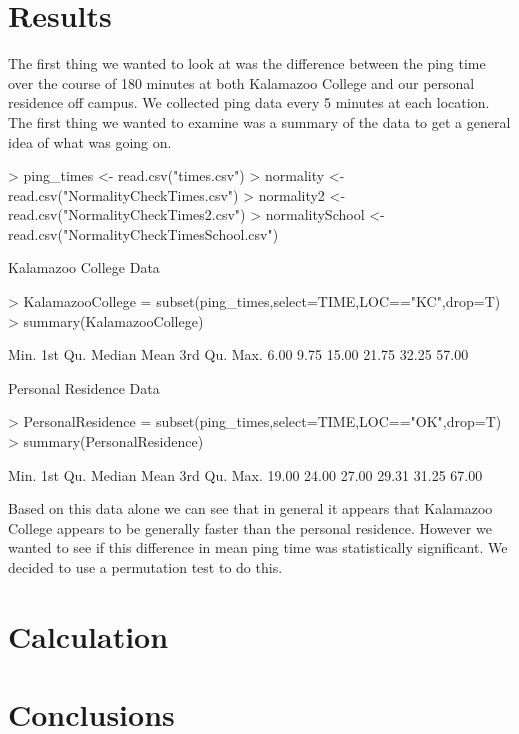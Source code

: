 \documentclass{article}
\begin{document}
\section{Results}
The first thing we wanted to look at was the difference between the ping time over the course of 180 minutes at both Kalamazoo College and our personal residence off campus.  We collected ping data every 5 minutes at each location.  The first thing we wanted to examine was a summary of the data to get a general idea of what was going on.
\begin{Schunk}
\begin{Sinput}
> ping_times <- read.csv("times.csv")
> normality <- read.csv("NormalityCheckTimes.csv")
> normality2 <- read.csv("NormalityCheckTimes2.csv")
> normalitySchool <- read.csv("NormalityCheckTimesSchool.csv")
\end{Sinput}
\end{Schunk}
Kalamazoo College Data
\begin{Schunk}
\begin{Sinput}
> KalamazooCollege = subset(ping_times,select=TIME,LOC=="KC",drop=T)
> summary(KalamazooCollege)
\end{Sinput}
\begin{Soutput}
   Min. 1st Qu.  Median    Mean 3rd Qu.    Max. 
   6.00    9.75   15.00   21.75   32.25   57.00 
\end{Soutput}
\end{Schunk}
Personal Residence Data
\begin{Schunk}
\begin{Sinput}
> PersonalResidence = subset(ping_times,select=TIME,LOC=="OK",drop=T)
> summary(PersonalResidence)
\end{Sinput}
\begin{Soutput}
   Min. 1st Qu.  Median    Mean 3rd Qu.    Max. 
  19.00   24.00   27.00   29.31   31.25   67.00 
\end{Soutput}
\end{Schunk}

Based on this data alone we can see that in general it appears that Kalamazoo College appears to be generally faster than the personal residence.  However we wanted to see if this difference in mean ping time was statistically significant.  We decided to use a permutation test to do this.


\section{Calculation}
\section{Conclusions}
\end{document}

